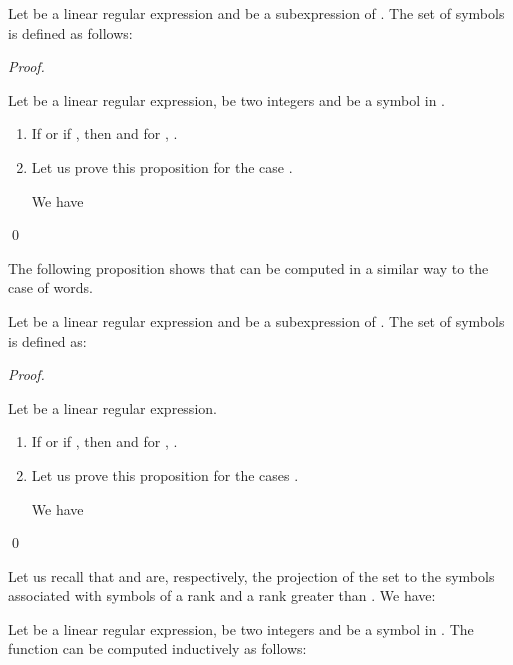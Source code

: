 \documentclass{llncs}
\begin{document}
\begin{proposition}
 \label{s}
Let  be a linear regular expression and  be a subexpression of . The set of symbols  is defined as follows:

\end{proposition}
\begin{proof}
\begin{sloppy}  
  
Let  be a linear regular expression,  be two integers and  be a symbol in .
\begin{enumerate}
\item If  or if , then  and for , .  

\item Let us prove this proposition for the case . 

We have 
 
\end{enumerate}
\end{sloppy}  
  \qed
\end{proof} 
The following proposition shows that  can be computed in a similar way to the case of words. 
\begin{proposition}
\label{prop firstsup}
Let  be a linear regular expression and  be a subexpression of . The set of symbols  is defined as: 

\end{proposition}
\begin{proof}
\begin{sloppy}  
  
Let  be a linear regular expression. 
\begin{enumerate}
\item If  or if , then  and for , .  

\item Let us prove this proposition for the cases . 

We have 
 
\end{enumerate}
\end{sloppy}  
\qed
\end{proof}

Let us recall that  and  are, respectively, the projection of the set  to the symbols associated with symbols of a rank  and a rank greater than . We have: 

\begin{proposition}\label{a}
Let  be a linear regular expression,  be two integers and  be a symbol in . 
The function  can be computed inductively as follows: 

\end{proposition}
\end{document}
